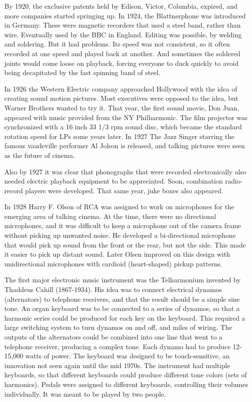 By 1920, the exclusive patents held by Edison, Victor, Columbia, expired, and more companies started springing up.
In 1924, the Blattnerphone was introduced in Germany. These were magnetic recorders that used a steel band, rather than wire. Eventually used by the BBC in England. Editing was possible, by welding and soldering. But it had problems. Its speed was not consistent, so it often recorded at one speed and played back at another. And sometimes the soldered joints would come loose on playback, forcing everyone to duck quickly to avoid being decapitated by the fast spinning band of steel.

In 1926 the Western Electric company approached Hollywood with the idea of creating sound motion pictures. Most executives were opposed to the idea, but Warner Brothers wanted to try it. That year, the first sound movie, Don Juan, appeared with music provided from the NY Philharmonic. The film projector was synchronized with a 16 inch 33 1/3 rpm sound disc, which became the standard rotation speed for LPs some years later. In 1927 The Jazz Singer starring the famous vaudeville performer Al Jolson is released, and talking pictures were seen as the future of cinema.

Also by 1927 it was clear that phonographs that were recorded electronically also needed electric playback equipment to be appreciated. Soon, combination radio-record players were developed. That same year, juke boxes also appeared.

In 1928 Harry F. Olson of RCA was assigned to work on microphones for the emerging area of talking cinema. At the time, there were no directional microphones, and it was difficult to keep a microphone out of the camera frame without picking up unwanted noise. He developed a bi-directional microphone that would pick up sound from the front or the rear, but not the side. This made it easier to pick up distant sound. Later Olsen improved on this design with unidirectional microphones with cardioid (heart-shaped) pickup patterns.

The first major electronic music instrument was the Telharmonium invented by Thaddeus Cahill (1867-1934).
His idea was to connect electrical dynamos (alternators) to telephone receivers, and that the result should be a simple sine tone. An organ keyboard was to be connected to a series of dynamos, so that a harmonic series could be produced for each key on the keyboard. This required a large switching system to turn dynamos on and off, and miles of wiring. The outputs of the alternators could be combined into one line that went to a telephone receiver, producing a complex tone. Each dynamo had to produce 12-15,000 watts of power. The keyboard was designed to be touch-sensitive, an innovation not seen again until the mid 1970s. The instrument had multiple keyboards, so that different keyboards could produce different tone colors (sets of harmonics). Pedals were assigned to different keyboards, controlling their volumes individually. It was meant to be played by two people.

